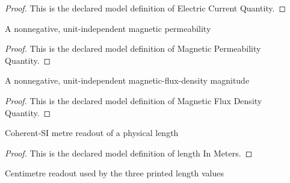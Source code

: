 \begin{proof}
  This is the declared model definition of Electric Current Quantity.
\end{proof}
\begin{definition}
  \label{def:physics:phyx-mini-0966:phyxminiproblems-problemphyxmini0966-magneticpermeabilityquantity}
  A nonnegative, unit-independent magnetic permeability
\end{definition}
\begin{proof}
  This is the declared model definition of Magnetic Permeability Quantity.
\end{proof}
\begin{definition}
  \label{def:physics:phyx-mini-0966:phyxminiproblems-problemphyxmini0966-magneticfluxdensityquantity}
  A nonnegative, unit-independent magnetic-flux-density magnitude
\end{definition}
\begin{proof}
  This is the declared model definition of Magnetic Flux Density Quantity.
\end{proof}
\begin{definition}
  \label{def:physics:phyx-mini-0966:phyxminiproblems-problemphyxmini0966-lengthinmeters}
  Coherent-SI metre readout of a physical length
\end{definition}
\begin{proof}
  This is the declared model definition of length In Meters.
\end{proof}
\begin{definition}
  \label{def:physics:phyx-mini-0966:phyxminiproblems-problemphyxmini0966-lengthincentimeters}
  Centimetre readout used by the three printed length values
\end{definition}
